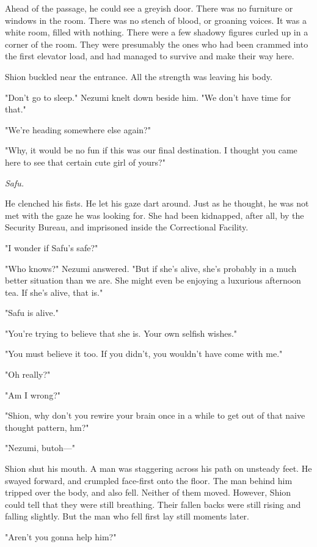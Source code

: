 Ahead of the passage, he could see a greyish door. There was no
furniture or windows in the room. There was no stench of blood, or
groaning voices. It was a white room, filled with nothing. There were a
few shadowy figures curled up in a corner of the room. They were
presumably the ones who had been crammed into the first elevator load,
and had managed to survive and make their way here.

Shion buckled near the entrance. All the strength was leaving his body.

"Don't go to sleep." Nezumi knelt down beside him. "We don't have time
for that."

"We're heading somewhere else again?"

"Why, it would be no fun if this was our final destination. I thought
you came here to see that certain cute girl of yours?"

\emph{Safu.}

He clenched his fists. He let his gaze dart around. Just as he thought,
he was not met with the gaze he was looking for. She had been kidnapped,
after all, by the Security Bureau, and imprisoned inside the
Correctional Facility.

"I wonder if Safu's safe?"

"Who knows?" Nezumi answered. "But if she's alive, she's probably in a
much better situation than we are. She might even be enjoying a
luxurious afternoon tea. If she's alive, that is."

"Safu is alive."

"You're trying to believe that she is. Your own selfish wishes."

"You must believe it too. If you didn't, you wouldn't have come with
me."

"Oh really?"

"Am I wrong?"

"Shion, why don't you rewire your brain once in a while to get out of
that naive thought pattern, hm?"

"Nezumi, but\el oh---"

Shion shut his mouth. A man was staggering across his path on unsteady
feet. He swayed forward, and crumpled face-first onto the floor. The man
behind him tripped over the body, and also fell. Neither of them moved.
However, Shion could tell that they were still breathing. Their fallen
backs were still rising and falling slightly. But the man who fell first
lay still moments later.

"Aren't you gonna help him?"


